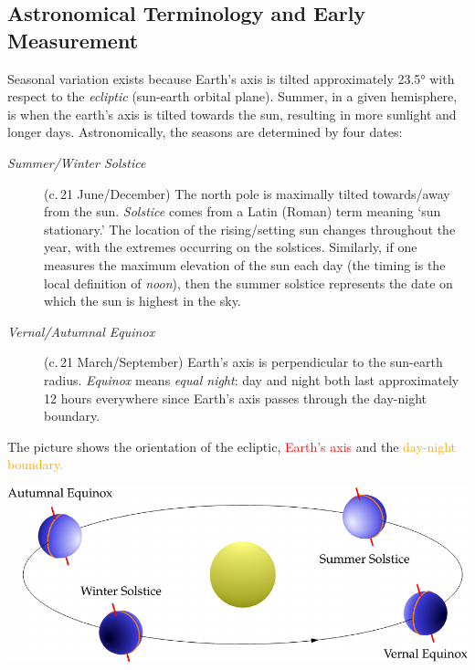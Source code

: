 \goodbreak



\subsection{Astronomical Terminology and Early Measurement}\label{ssec:astro1}



Seasonal variation exists because Earth's axis is tilted approximately \ang{23.5} with respect to the \emph{ecliptic} (sun-earth orbital plane). Summer, in a given hemisphere, is when the earth's axis is tilted towards the sun, resulting in more sunlight and longer days. Astronomically, the seasons are determined by four dates:
\begin{description}
	\item[\normalfont\emph{Summer/Winter Solstice}] (c.\,21\st{} June/December) The north pole is maximally tilted towards/away from the sun. \emph{Solstice} comes from a Latin (Roman) term meaning `sun stationary.' The location of the rising/setting sun changes throughout the year, with the extremes occurring on the solstices. Similarly, if one measures the maximum elevation of the sun each day (the timing is the local definition of \emph{noon}), then the summer solstice represents the date on which the sun is highest in the sky.
	\item[\normalfont\emph{Vernal/Autumnal Equinox}] (c.\,21\st{} March/September) Earth's axis is perpendicular to the sun-earth radius. \emph{Equinox} means \emph{equal night}: day and night both last approximately 12 hours everywhere since Earth's axis passes through the day-night boundary.
\end{description}
The picture shows the orientation of the ecliptic, \textcolor{red}{Earth's axis} and the \textcolor{orange}{day-night boundary.}

\begin{center}
\href{http://www.math.uci.edu/~ndonalds/math184/ecliptic.html}{\includegraphics[scale=0.95]{ecliptic}}
\end{center}

